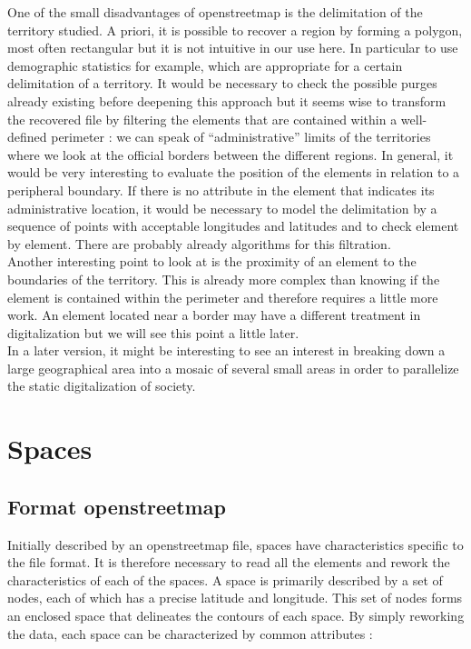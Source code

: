One of the small disadvantages of openstreetmap is the delimitation of the territory studied. A priori, it is possible to recover a region by forming a polygon, most often rectangular but it is not intuitive in our use here. In particular to use demographic statistics for example, which are appropriate for a certain delimitation of a territory. It would be necessary to check the possible purges already existing before deepening this approach but it seems wise to transform the recovered file by filtering the elements that are contained within a well-defined perimeter : we can speak of ``administrative'' limits of the territories where we look at the official borders between the different regions. In general, it would be very interesting to evaluate the position of the elements in relation to a peripheral boundary. If there is no attribute in the element that indicates its administrative location, it would be necessary to model the delimitation by a sequence of points with acceptable longitudes and latitudes and to check element by element. There are probably already algorithms for this filtration.\\

Another interesting point to look at is the proximity of an element to the boundaries of the territory. This is already more complex than knowing if the element is contained within the perimeter and therefore requires a little more work. An element located near a border may have a different treatment in digitalization but we will see this point a little later.\\

In a later version, it might be interesting to see an interest in breaking down a large geographical area into a mosaic of several small areas in order to parallelize the static digitalization of society.\\

\newpage

\section{Spaces}

\subsection{Format openstreetmap}

Initially described by an openstreetmap file, spaces have characteristics specific to the file format. It is therefore necessary to read all the elements and rework the characteristics of each of the spaces. A space is primarily described by a set of nodes, each of which has a precise latitude and longitude. This set of nodes forms an enclosed space that delineates the contours of each space. By simply reworking the data, each space can be characterized by common attributes : \\

